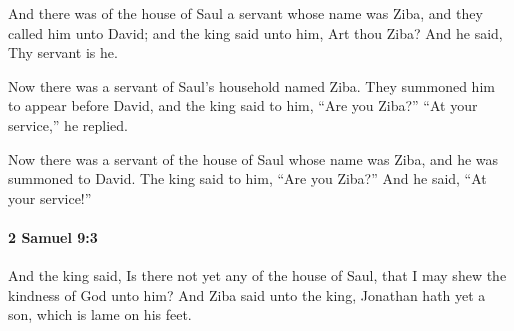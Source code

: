 			\begin{versebox}
					\item[BHS] 
					\item[ASV] And there was of the house of Saul a servant whose name was Ziba, and they called him unto David; and the king said unto him, Art thou Ziba? And he said, Thy servant is he.
					\item[NIV] Now there was a servant of Saul’s household named Ziba. They summoned him to appear before David, and the king said to him, “Are you Ziba?” “At your service,” he replied.
					\item[NRSV] Now there was a servant of the house of Saul whose name was Ziba, and he was summoned to David. The king said to him, “Are you Ziba?” And he said, “At your service!”
			\end{versebox}

		\paragraph{2 Samuel 9:3} %
			\label{2SAMUEL-9-3}

			And the king said, Is there not yet any of the house of Saul, that I may shew the kindness of God unto him? And Ziba said unto the king, Jonathan hath yet a son, which is lame on his feet.

